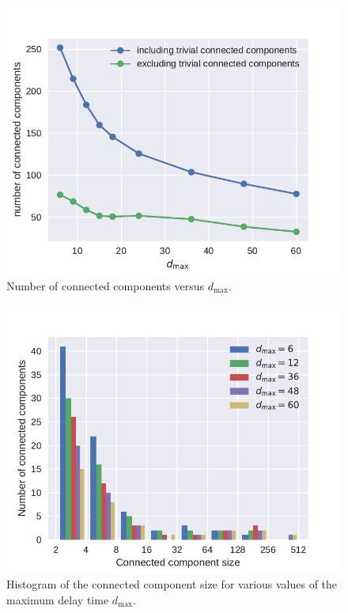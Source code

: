 \begin{figure}[htpb]
\includegraphics[width=\columnwidth]{pics/instances/num_cc.pdf}
\caption[Number of non-trivial connected components vs. $d_{\max}$]{Number of connected components versus $d_{\max}$.}
\label{fig:num-CCs-vs-dmax}
\end{figure}

\begin{figure}[htpb]
\includegraphics[width=\columnwidth]{pics/instances/analysis_cc.pdf}
\caption[Histogram of connected component sizes]{Histogram of the connected component size for various values of the maximum delay time $d_\text{max}$.}
\label{fig:hist-CC-sizes}
\end{figure}

